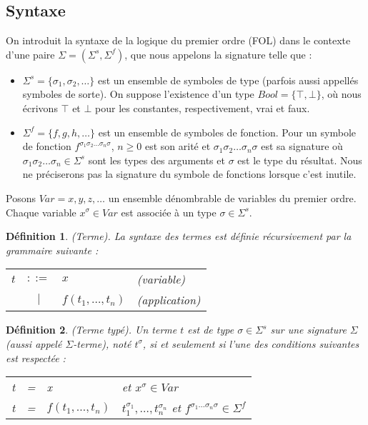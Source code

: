 \documentclass[11pt,openany]{article}
\newtheorem{definition}{D\'efinition}[subsection]
\begin{document}
	\subsection{Syntaxe}
		On introduit la syntaxe de la logique du premier ordre (FOL) dans le contexte d'une paire $\Sigma = (\Sigma^s,\Sigma^f)$, que nous appelons la signature telle que :
		\begin{itemize}
		\item $\Sigma^s = \{ \sigma_{1}, \sigma_{2},\ldots\}$ est un ensemble de symboles de type (parfois aussi appell\'es symboles de sorte). On suppose l'existence d'un type $Bool = \{ \top , \bot \}$, o\`u nous \'ecrivons $\top$ et $\bot$ pour les constantes, respectivement, vrai et faux.
		\item $\Sigma^f = \{ f, g, h,\ldots\}$ est un ensemble de symboles de fonction. Pour un symbole de fonction $f^{\sigma_{1}\sigma_{2}\ldots \sigma_{n}\sigma}$, $n \geq 0$ est son arit\'e et $\sigma_{1}\sigma_{2}\ldots \sigma_{n}\sigma$ est sa signature o\`u $\sigma_{1}\sigma_{2}\ldots \sigma_{n} \in \Sigma^{s}$ sont les types des arguments et $\sigma$ est le type du r\'esultat. Nous ne pr\'eciserons pas la signature du symbole de fonctions lorsque c'est inutile.
		\end{itemize}

	   Posons $Var = {x,y,z,\ldots}$ un ensemble d\'enombrable de variables du premier ordre. Chaque variable $x^{\sigma} \in Var$ est associ\'ee \`a un type $\sigma \in \Sigma^{s}$.
	   
\begin{definition}
(Terme). La syntaxe des termes est d\'efinie r\'ecursivement par la grammaire suivante :

\begin{tabular}{lcll}
$t$ & $::=$ & $x$ & (variable) \\
 & $|$ & $f(t_1,\ldots,t_n)$ & (application)
\end{tabular}

\end{definition}	   
	   
\begin{definition} (Terme typ\'e).
Un terme $t$ est de type $\sigma\in\Sigma^s$ sur une signature $\Sigma$ (aussi appel\'e $\Sigma$-terme), not\'e $t^\sigma$, si et seulement si l'une des conditions suivantes est respect\'ee :
\begin{tabular}{lcll}
t & = & x & et $x^\sigma\in Var$\\
t & = & $f(t_1,\ldots,t_n)$ & $t_1^{\sigma_1},\ldots,t_n^{\sigma_n}$ et $f^{\sigma_1\ldots\sigma_n\sigma}\in\Sigma^f$

\end{tabular}
\end{definition}
\end{document}
